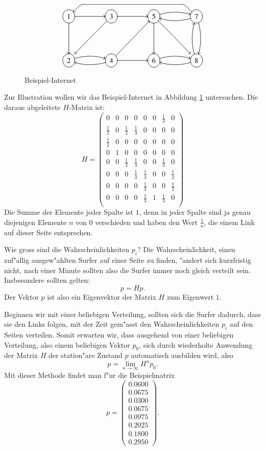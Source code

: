 \begin{figure}
\[\UseTips
\entrymodifiers={++[o][F]}
\xymatrix @=1.5cm {
1 \ar[r] \ar[d]
	& 3 \ar[r] \ar@(dl,dl)[dl]
		& 5 \ar[d] \ar@/^/[r] \ar@(dr,dr)[rd]
			& 7 \ar@/^/[d]  \ar@/^/[l]
\ar `ul^l[lll]+/u6mm/`l^dl[lll] [lll]
\\
2 \ar@/^/[r]
	& 4 \ar@/^/[l] \ar[r] \ar[ur]
		& 6 \ar@/^/[r]
			& 8 \ar@/^/[l] \ar@/^/[u]
}
\]
\caption{Beispiel-Internet\label{google-sample}}
\end{figure}
Zur Illustration wollen wir das Beispiel-Internet in Abbildung \ref{google-sample}
untersuchen.
Die daraus abgeleitete $H$-Matrix ist:
\[
H=\left(
\begin{matrix}
0&0&0&0&0&0&\frac13&0\\
\frac12&0&\frac12&\frac13&0&0&0&0\\
\frac12&0&0&0&0&0&0&0\\
0&1&0&0&0&0&0&0\\
0&0&\frac12&\frac13&0&0&\frac13&0\\
0&0&0&\frac13&\frac13&0&0&\frac12\\
0&0&0&0&\frac13&0&0&\frac12\\
0&0&0&0&\frac13&1&\frac13&0\\
\end{matrix}
\right)
\]
Die Summe der Elemente jeder Spalte ist $1$, denn in jeder Spalte sind ja genau
diejenigen Elemente $n$ von $0$ verschieden und haben den Wert $\frac1n$,
die einem Link auf dieser Seite entsprechen.

Wie gross sind die Wahrscheinlichkeiten $p_i$? Die Wahrscheinlichkeit, einen zuf"allig
ausgew"ahlten Surfer auf einer Seite zu finden, "andert sich kurzfristig nicht, nach
einer Minute sollten also die Surfer immer noch gleich verteilt sein. Insbesondere
sollten gelten:
\[
p=Hp.
\]
Der Vektor $p$ ist also ein Eigenvektor der Matrix $H$ zum Eigenwert $1$.

Beginnen wir mit einer beliebigen Verteilung, sollten sich die Surfer dadurch,
dass sie den Links folgen, mit der Zeit gem"asst den Wahrscheinlichkeiten $p_i$
auf den Seiten verteilen. Somit erwarten wir, dass ausgehend von einer beliebigen
Verteilung, also einem beliebigen Vektor $p_0$, sich durch wiederholte Anwendung der
Matrix $H$ der station"are Zustand $p$ automatisch ausbilden wird, also
\[
p=\lim_{n\to\infty}H^np_0.
\]
Mit dieser Methode findet man f"ur die Beispielmatrix
\[
p=\left(
\begin{matrix}
0.0600\\0.0675\\0.0300\\0.0675\\0.0975\\0.2025\\0.1800\\0.2950
\end{matrix}
\right).
\]

